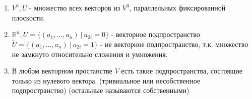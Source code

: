 \documentclass[a4paper, 12pt]{article}
\newcommand{\R}{\mathbb R}
\theoremstyle{definition}
\begin{document}
    \begin{enumerate} 
      \item $V^3, U$ - множество всех векторов из $V^3$, параллельных фиксированной\\ плоскости.
      \item $\R^n, U=\{(a_1,..., a_n) \ | \ a_{2i} = 0\}$ - векторное подпространство \\ $\widetilde{U} = \{(a_1,..., a_n) \ | \ a_{2i} = 1\}$ - не векторное подпространство, т.к. множество не замкнуто относительно сложения и умножения.
      \item В любом векторном простанстве $V$ есть такие подпространства, состоящие только из нулевого вектора. (тривиальное или несобственное подпространство) (остальные называются собственными)
    \end{enumerate}
  
  \newpage
\end{document}
